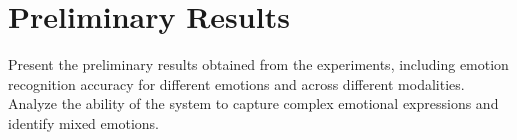 \section{Preliminary Results}
\label{sec:results}

Present the preliminary results obtained from the experiments, including emotion recognition accuracy for different emotions and across different modalities.
Analyze the ability of the system to capture complex emotional expressions and identify mixed emotions.


